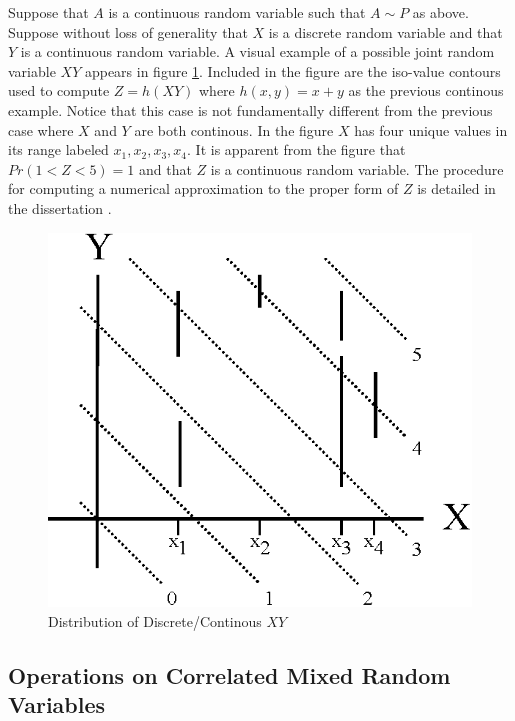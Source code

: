 Suppose that $A$ is a continuous random variable such that $A \sim P$ as above. Suppose without loss of generality that $X$ is a discrete random variable and that $Y$ is a continuous random variable. A visual example of a possible joint random variable $XY$ appears in figure \ref{fig:XY_discrete_continuous}. Included in the figure are the iso-value contours used to compute $Z = h(XY)$ where $h(x,y) = x+y$ as the previous continous example. Notice that this case is not fundamentally different from the previous case where $X$ and $Y$ are both continous. In the figure $X$ has four unique values in its range labeled $x_1, x_2, x_3, x_4$. It is apparent from the figure that $Pr(1 < Z < 5) = 1$ and that $Z$ is a continuous random variable. The procedure for computing a numerical approximation to the proper form of $Z$ is detailed in the dissertation \cite{fielden12}. 

\begin{figure}
  \centering
  \includegraphics{Images/XY_discrete_continous.eps}
  \caption[Joint Distribution of Correlated Discrete $X$ and Continous $Y$ in $XY$-space]
          {Distribution of Discrete/Continous $XY$}
  \label{fig:XY_discrete_continuous}
\end{figure}

\subsection{Operations on Correlated Mixed Random Variables}


